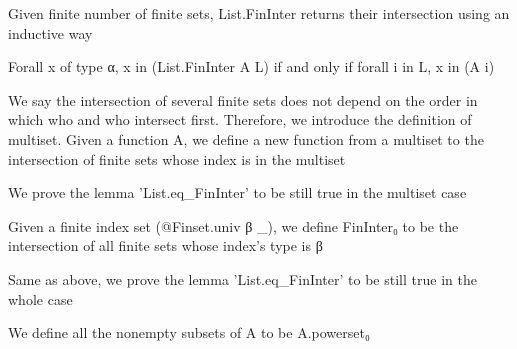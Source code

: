 
\begin{definition}\label{List.FinInter}
        \leanok
                Given finite number of finite sets, List.FinInter returns their intersection using an inductive way
    \end{definition}

\begin{lemma}\label{List.eq_FinInter}
                Forall x of type α, x in (List.FinInter A L) if and only if forall i in L, x in (A i)
    \end{lemma}

\begin{definition}\label{Multiset.FinInter}
                We say the intersection of several finite sets does not depend on the order in which who and who intersect first. Therefore, we introduce the definition of multiset. Given a function A, we define a new function from a multiset to the intersection of finite sets whose index is in the multiset
    \end{definition}

\begin{lemma}\label{Multiset.eq_FinInter}
                We prove the lemma 'List.eq_FinInter' to be still true in the multiset case
    \end{lemma}

\begin{definition}\label{FinInter₀}
                Given a finite index set (@Finset.univ β _), we define FinInter₀ to be the intersection of all finite sets whose index's type is β
    \end{definition}

\begin{lemma}\label{eq_FinInter₀}
                Same as above, we prove the lemma 'List.eq_FinInter' to be still true in the whole case
    \end{lemma}

\begin{definition}\label{Finset.powerset₀}
        \leanok
                We define all the nonempty subsets of A to be A.powerset₀
    \end{definition}

